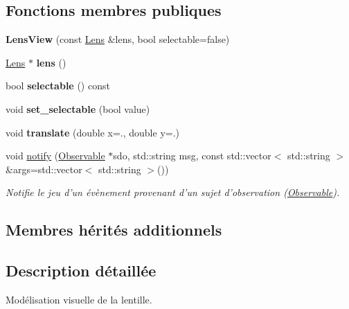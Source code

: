 \subsection*{Fonctions membres publiques}
\begin{DoxyCompactItemize}
\item 
\hypertarget{classLensView_a678ca25c84417e53af04258d27e5979a}{{\bfseries Lens\+View} (const \hyperlink{classLens}{Lens} \&lens, bool selectable=false)}\label{classLensView_a678ca25c84417e53af04258d27e5979a}

\item 
\hypertarget{classLensView_a9af15abae80b9588e61de5a0d929101f}{\hyperlink{classLens}{Lens} $\ast$ {\bfseries lens} ()}\label{classLensView_a9af15abae80b9588e61de5a0d929101f}

\item 
\hypertarget{classLensView_abcf4b929c4008fe2d0d464e1ec113037}{bool {\bfseries selectable} () const }\label{classLensView_abcf4b929c4008fe2d0d464e1ec113037}

\item 
\hypertarget{classLensView_a3a35c1e61503da599b1d9c93c176dffd}{void {\bfseries set\+\_\+selectable} (bool value)}\label{classLensView_a3a35c1e61503da599b1d9c93c176dffd}

\item 
\hypertarget{classLensView_a60a6a9fa6212d8d5997c77f8ee63b38d}{void {\bfseries translate} (double x=., double y=.)}\label{classLensView_a60a6a9fa6212d8d5997c77f8ee63b38d}

\item 
void \hyperlink{classLensView_a55574a71ccc10e389b155b4029f74d5a}{notify} (\hyperlink{classObservable}{Observable} $\ast$sdo, std\+::string msg, const std\+::vector$<$ std\+::string $>$ \&args=std\+::vector$<$ std\+::string $>$())
\begin{DoxyCompactList}\small\item\em Notifie le jeu d'un évènement provenant d'un sujet d'observation (\hyperlink{classObservable}{Observable}). \end{DoxyCompactList}\end{DoxyCompactItemize}
\subsection*{Membres hérités additionnels}


\subsection{Description détaillée}
Modélisation visuelle de la lentille. 

